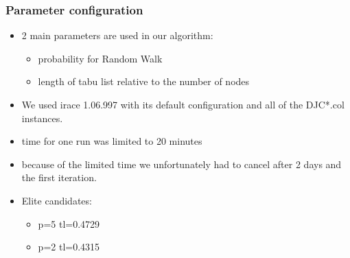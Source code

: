 \documentclass{beamer}
\begin{document}
\begin{frame}
    \frametitle{Parameter configuration}
    \begin{itemize}
    \item 2 main parameters are used in our algorithm:
      \begin{itemize}
      \item probability for Random Walk
      \item length of tabu list relative to the number of nodes
      \end{itemize}

      
  \item We used irace 1.06.997 with its default configuration and all of the DJC*.col instances.
  \item time for one run was limited to 20 minutes
  \item because of the limited time we unfortunately had to cancel after 2 days and the first iteration.

  \item Elite candidates:
    \begin{itemize}
    \item p=5 tl=0.4729
    \item p=2 tl=0.4315

    \end{itemize}


    \end{itemize} 
  \end{frame}
\end{document}
